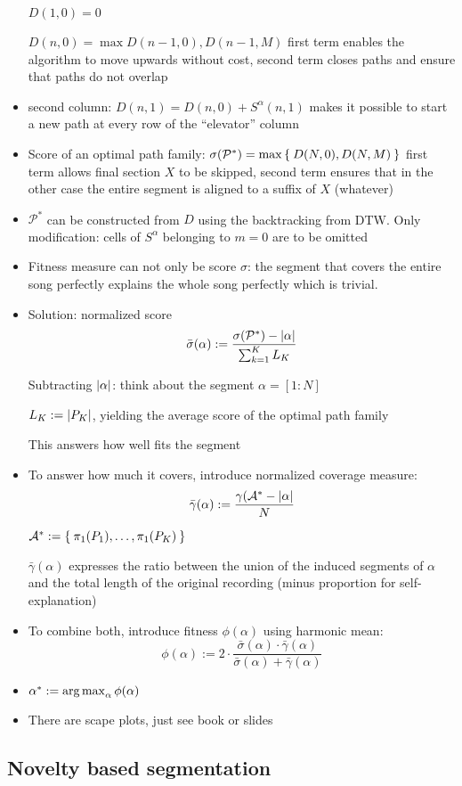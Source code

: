 \begin{itemize}
		$D(1,0) = 0$

		$D(n,0) = \max{D(n-1,0), D(n-1, M)}$ first term enables the algorithm to move upwards without cost, second term closes paths and ensure that paths do not overlap
	\item
		second column: $D(n,1) = D(n,0) + S^\alpha(n,1)$ makes it possible to start a new path at every row of the \enquote{elevator} column
	\item
		Score of an optimal path family: $\sigma(\mathcal{P}^*) = \max \Set{D(N,0), D(N,M)}$ first term allows final section $X$ to be skipped, second term ensures that in the other case the entire segment is aligned to a suffix of $X$ (whatever)
	\item
		$\mathcal{P}^*$ can be constructed from $D$ using the backtracking from DTW. Only modification: cells of $S^\alpha$ belonging to $m=0$ are to be omitted
	\item
		Fitness measure can not only be score $\sigma$: the segment that covers the entire song perfectly explains the whole song perfectly which is trivial.
	\item
		Solution: normalized score 
		$$\bar\sigma(\alpha) := \frac{\sigma(\mathcal{P}^*) - \lvert\alpha\rvert}{\sum_{k=1}^K L_K}$$

		Subtracting $\lvert\alpha\rvert$: think about the segment $\alpha = [1:N]$

		$L_K := \lvert P_K\rvert$, yielding the average score of the optimal path family

		This answers how well fits the segment
	\item
		To answer how much it covers, introduce normalized coverage measure:
		$$
		\bar\gamma(\alpha) := \frac{\gamma(\mathcal{A}^* - \lvert\alpha\rvert}{N}$$

		$\mathcal{A}^* := \Set{\pi_1(P_1), \dots, \pi_1(P_K)}$

		$\bar\gamma(\alpha)$ expresses the ratio between the union of the induced segments of $\alpha$ and the total length of the original recording (minus proportion for self-explanation)

	\item
		To combine both, introduce fitness $\phi(\alpha)$ using harmonic mean:
		$$ \phi(\alpha) := 2 \cdot \frac{\bar\sigma(\alpha) \cdot \bar\gamma(\alpha)}{\bar\sigma(\alpha) + \bar\gamma(\alpha)}$$

	\item
		$\alpha^* := \operatorname*{arg\,max}_\alpha \phi(\alpha)$

	\item
		There are scape plots, just see book or slides
\end{itemize}



\subsection{Novelty based segmentation}

